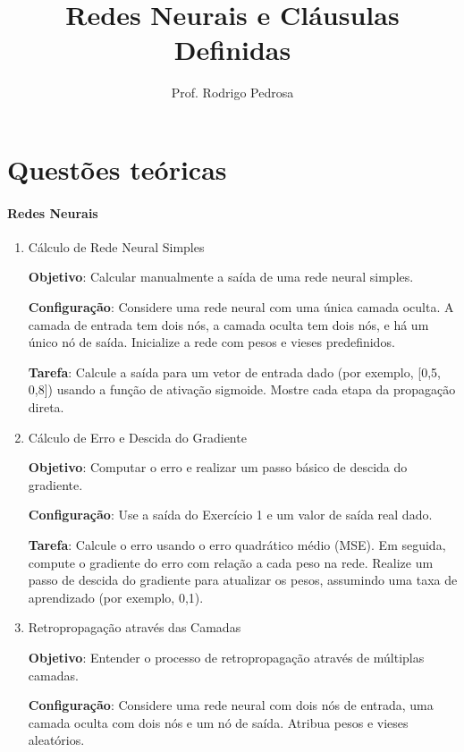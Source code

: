 \documentclass{article}
\title{Redes Neurais e Cláusulas Definidas}
\author{Prof. Rodrigo Pedrosa}
\begin{document}
\maketitle

\vspace{-1.2cm}

\section{Questões teóricas}

\paragraph{Redes Neurais}

\begin{enumerate}



    \item Cálculo de Rede Neural Simples

\textbf{Objetivo}: Calcular manualmente a saída de uma rede neural simples.

\textbf{Configuração}: Considere uma rede neural com uma única camada oculta. A camada de entrada tem dois nós, a camada oculta tem dois nós, e há um único nó de saída. Inicialize a rede com pesos e vieses predefinidos.

\textbf{Tarefa}: Calcule a saída para um vetor de entrada dado (por exemplo, [0,5, 0,8]) usando a função de ativação sigmoide. Mostre cada etapa da propagação direta.

\item Cálculo de Erro e Descida do Gradiente

\textbf{Objetivo}: Computar o erro e realizar um passo básico de descida do gradiente.

\textbf{Configuração}: Use a saída do Exercício 1 e um valor de saída real dado.

\textbf{Tarefa}: Calcule o erro usando o erro quadrático médio (MSE). Em seguida, compute o gradiente do erro com relação a cada peso na rede. Realize um passo de descida do gradiente para atualizar os pesos, assumindo uma taxa de aprendizado (por exemplo, 0,1).

\item Retropropagação através das Camadas

\textbf{Objetivo}: Entender o processo de retropropagação através de múltiplas camadas.

\textbf{Configuração}: Considere uma rede neural com dois nós de entrada, uma camada oculta com dois nós e um nó de saída. Atribua pesos e vieses aleatórios.


\end{enumerate}
\end{document}
